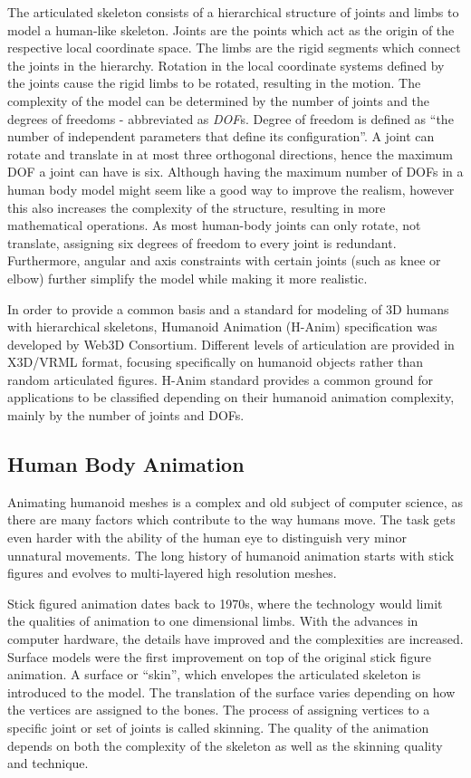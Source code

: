 The articulated skeleton consists of a hierarchical structure of joints and limbs to model a human-like skeleton. Joints are the points which act as the origin of the respective 
local coordinate space. The limbs are the rigid segments which connect the joints in the hierarchy. Rotation in the local coordinate systems defined by the joints cause the rigid
limbs to be rotated, resulting in the motion. The complexity of the model can be determined by the number of joints and the degrees of freedoms - abbreviated as \textit{DOF}s.
Degree of freedom is defined as ``the number of independent parameters that define its configuration''\cite{Lazard2013}. A joint can rotate and translate in at most three orthogonal
directions, hence the maximum DOF a joint can have is six. Although having the maximum number of DOFs in a human body model might seem like a good way to improve the realism, 
however this also increases the complexity of the structure, resulting in more mathematical operations. As most human-body joints can only rotate, not translate, assigning six 
degrees of freedom to every joint is redundant. Furthermore, angular and axis constraints with certain joints (such as knee or elbow) further simplify the model while making it 
more realistic. 

In order to provide a common basis and a standard for modeling of 3D humans with hierarchical skeletons, Humanoid Animation (H-Anim) specification was developed by 
Web3D Consortium\cite{HANIM}. Different levels of articulation are provided in X3D/VRML format, focusing specifically on humanoid objects rather than random 
articulated figures. H-Anim standard provides a common ground for applications to be classified depending on their humanoid animation complexity, mainly by the 
number of joints and DOFs. 

\subsection{Human Body Animation}
\label{section_related_human_body_animation}

Animating humanoid meshes is a complex and old subject of computer science, as there are many factors which contribute to the way humans move. The task gets 
even harder with the ability of the human eye to distinguish very minor unnatural movements. The long history of humanoid animation starts with stick figures 
and evolves to multi-layered high resolution meshes. 

Stick figured animation dates back to 1970s, where the technology would limit the qualities of animation to one dimensional limbs\cite{Badler1979}.
With the advances in computer hardware, the details have improved and the complexities are increased. Surface models were the first improvement on top 
of the original stick figure animation. A surface or ``skin'', which envelopes the articulated skeleton is 
introduced to the model. The translation of the surface varies depending on how the vertices are assigned to the bones. The process of assigning vertices to 
a specific joint or set of joints is called skinning. The quality of the animation depends on both the complexity of the skeleton as well as the skinning 
quality and technique. 

